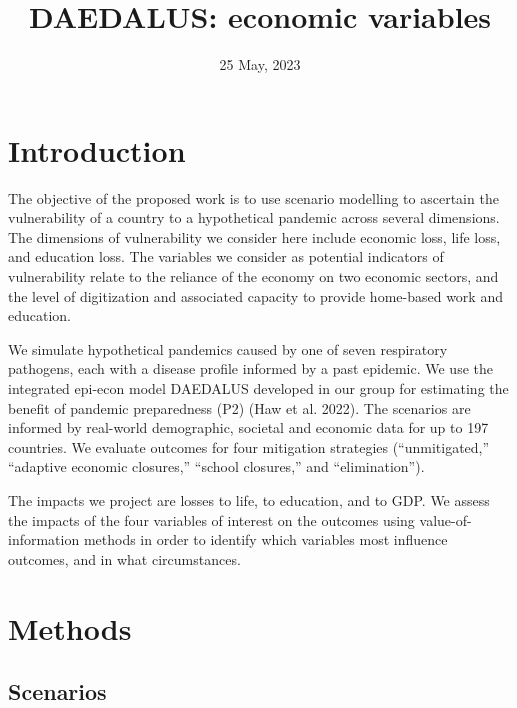 \documentclass[
]{article}
\title{DAEDALUS: economic variables}
\author{}
\date{\vspace{-2.5em}25 May, 2023}
\begin{document}
\maketitle

{
\setcounter{tocdepth}{5}
\tableofcontents
}

\hypertarget{introduction}{%
\section{Introduction}\label{introduction}}

The objective of the proposed work is to use scenario modelling to ascertain the vulnerability of a country to a hypothetical pandemic across several dimensions. The dimensions of vulnerability we consider here include economic loss, life loss, and education loss. The variables we consider as potential indicators of vulnerability relate to the reliance of the economy on two economic sectors, and the level of digitization and associated capacity to provide home-based work and education.

We simulate hypothetical pandemics caused by one of seven respiratory pathogens, each with a disease profile informed by a past epidemic. We use the integrated epi-econ model DAEDALUS developed in our group for estimating the benefit of pandemic preparedness (P2) (Haw et al. 2022). The scenarios are informed by real-world demographic, societal and economic data for up to 197 countries. We evaluate outcomes for four mitigation strategies (``unmitigated,'' ``adaptive economic closures,'' ``school closures,'' and ``elimination'').

The impacts we project are losses to life, to education, and to GDP. We assess the impacts of the four variables of interest on the outcomes using value-of-information methods in order to identify which variables most influence outcomes, and in what circumstances.

\hypertarget{methods}{%
\section{Methods}\label{methods}}

\hypertarget{scenarios}{%
\subsection{Scenarios}\label{scenarios}}
\end{document}
